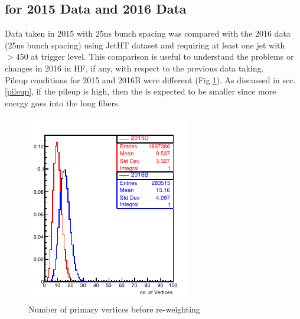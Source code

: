 \subsection{\ratiosl for 2015 Data and 2016 Data}\label{sec:2015vs2016}
Data taken in 2015 with 25ns bunch spacing was compared with the 2016 data (25ns bunch spacing) using JetHT dataset and requiring at least one jet with \pt $> 450$ \gev at trigger level. This comparison is useful to understand the problems or changes in 2016 in HF, if any, with respect to the previous data taking.\\
Pileup conditions for 2015 and 2016B were different (Fig.\ref{nVtx2015D_2016B}). As discussed in sec.\ref{pileup}, if the pileup is high, then the \ratiosl is expected to be smaller since more energy goes into the long fibers.
\begin{figure}[ht]
\begin{minipage}[b]{0.5\linewidth}
\centering
\includegraphics[width=0.99\linewidth]{../Figures/Chap2/ImageFiles_HF/BasicPics/Comp2015vs2016B/nVtx2015D_2016B.pdf}
\captionsetup{width=.9\linewidth}
\caption{Number of primary vertices before re-weighting}
\label{nVtx2015D_2016B}
\end{minipage}

\end{figure}
